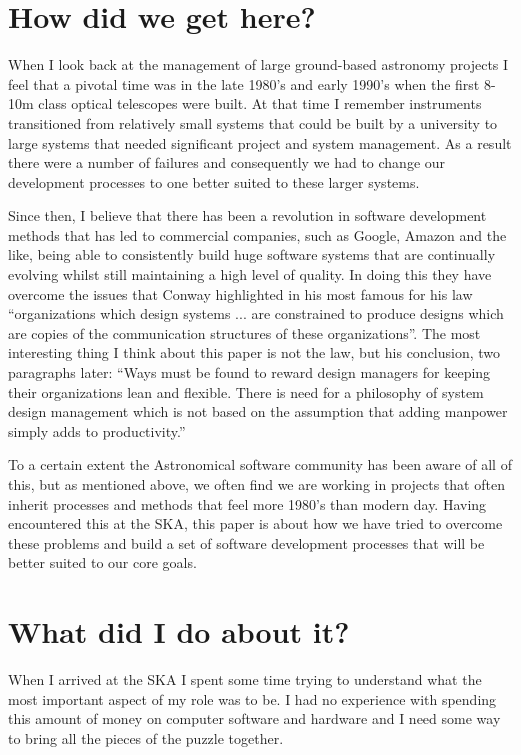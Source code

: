 \documentclass[11pt,twoside]{article}
\begin{document}
\section{How did we get here?}
When I look back at the management of large ground-based astronomy projects I feel that a pivotal time was in the late 1980's and early 1990's when the first 8-10m class optical telescopes were built. At that time I remember instruments transitioned from relatively small systems that could be built by a university to large systems that needed significant project and system management. As a result there were a number of failures and consequently we had to change our development processes to one better suited to these larger systems.

Since then, I believe that there has been a revolution in software development methods that has led to commercial companies, such as Google, Amazon and the like, being able to consistently build huge software systems that are continually evolving whilst still maintaining a high level of quality. In doing this they have overcome the issues that Conway highlighted in his most famous for his law\cite{conway1968} ``organizations which design systems ... are constrained to produce designs which are copies of the communication structures of these organizations''. The most interesting thing I think about this paper is not the law, but his conclusion, two paragraphs later: ``Ways must be found to reward design managers for keeping their organizations lean and flexible. There is need for a philosophy of system design management which is not based on the assumption that adding manpower simply adds to productivity.''

To a certain extent the Astronomical software community has been aware of all of this, but as mentioned above, we often find we are working in projects that often inherit processes and methods that feel more 1980's than modern day. Having encountered this at the SKA, this paper is about how we have tried to overcome these problems and build a set of software development processes that will be better suited to our core goals.

\section{What did I do about it?}
When I arrived at the SKA I spent some time trying to understand what the most important aspect of my role was to be. I had no experience with spending this amount of money on computer software and hardware and I need some way to bring all the pieces of the puzzle together. 
\end{document}
